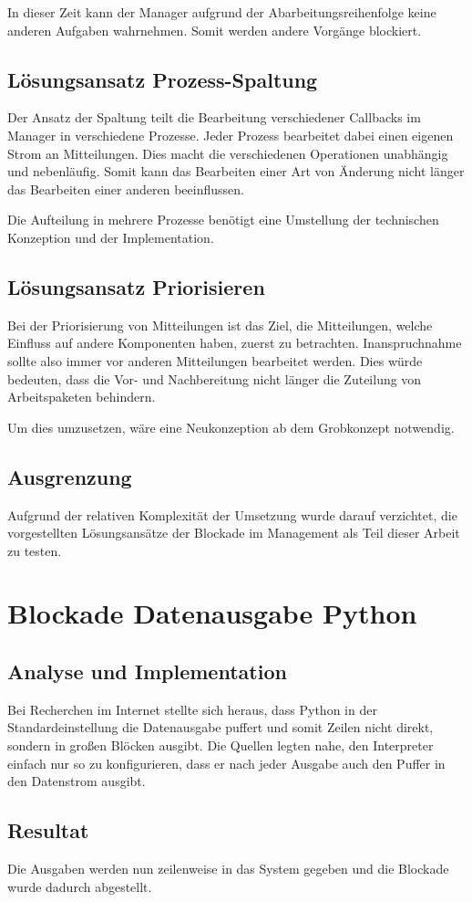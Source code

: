In dieser Zeit kann der Manager aufgrund der Abarbeitungsreihenfolge
keine anderen Aufgaben wahrnehmen.
Somit werden andere Vorgänge blockiert.

\subsection{Lösungsansatz Prozess-Spaltung}

Der Ansatz der Spaltung teilt die Bearbeitung verschiedener Callbacks im Manager
in verschiedene Prozesse. Jeder Prozess bearbeitet dabei einen eigenen Strom an Mitteilungen. Dies macht die verschiedenen Operationen unabhängig und nebenläufig.
Somit kann das Bearbeiten einer Art von Änderung nicht länger das Bearbeiten einer anderen beeinflussen.

Die Aufteilung in mehrere Prozesse benötigt eine Umstellung der technischen Konzeption und der Implementation.

\subsection{Lösungsansatz Priorisieren}

Bei der Priorisierung von Mitteilungen ist das Ziel,
die Mitteilungen, welche Einfluss auf andere Komponenten haben, zuerst zu betrachten.
Inanspruchnahme sollte also immer vor anderen Mitteilungen bearbeitet werden.
Dies würde bedeuten, dass die Vor- und Nachbereitung nicht länger die Zuteilung von Arbeitspaketen behindern.

Um dies umzusetzen, wäre eine Neukonzeption ab dem Grobkonzept notwendig.


\subsection{Ausgrenzung}

Aufgrund der relativen Komplexität der Umsetzung
wurde darauf verzichtet, die vorgestellten Lösungsansätze der Blockade im Management
als Teil dieser Arbeit zu testen.

\section{Blockade Datenausgabe Python}
\label{cha:opt:block-py-io}

\subsection{Analyse und Implementation}

Bei Recherchen im Internet stellte sich heraus,
dass Python in der Standardeinstellung die Datenausgabe puffert und somit Zeilen nicht direkt,
sondern in großen Blöcken ausgibt.
Die Quellen legten nahe, den Interpreter einfach nur so zu konfigurieren,
dass er nach jeder Ausgabe auch den Puffer in den Datenstrom ausgibt.

\subsection{Resultat}

Die Ausgaben werden nun zeilenweise in das System gegeben und die Blockade wurde dadurch abgestellt.
